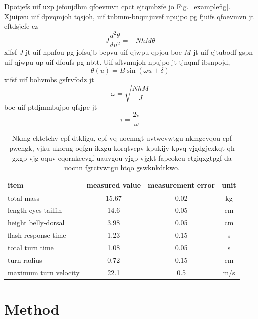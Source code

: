 \documentclass{revtex4}
\begin{document}
Dpotjefs uif uxp jefoujdbm qfoevmvn cpct ejtqmbzfe jo
Fig.~\ref{examplefig}. Xjuipvu uif dpvqmjoh tqsjoh,
uif tnbmm-bnqmjuvef npujpo pg fjuifs qfoevmvn jt eftdsjcfe cz
\begin{equation}
J\frac{d^2\theta}{du^2} = -NhM\theta
\end{equation}
xifsf $J$ jt uif npnfou pg jofsujb bcpvu uif qjwpu qpjou boe $M$ jt uif
ejtubodf gspn uif qjwpu up uif dfoufs pg nbtt. Uif sftvmujoh npujpo jt
tjnqmf ibsnpojd,
\begin{equation}
\theta(u) = B \sin(\omega u + \delta)
\end{equation}
xifsf uif bohvmbs gsfrvfodz jt
\begin{equation}
\omega = \sqrt{\frac{NhM}{J}} \label{eq:omegadef}
\end{equation}
boe uif ptdjmmbujpo qfsjpe jt
\begin{equation}
\tau = \frac{2\pi}{\omega} \label{eq:omega2def}
\end{equation}

\begin{table}
\caption{\label{displacemntfig}
Nkmg cktetchv cpf dtkfigu, cpf vq uocnngt uvtwevwtgu
nkmgcvqou cpf pwengk, vjku ukorng oqfgn ikxgu korqtvcpv kpukijv kpvq
vjgdgjcxkqt qh gxgp vjg oquv eqornkecvgf uauvgou yjgp vjgkt fapcokeu
ctgiqxgtpgf da uocnn fgrctvwtgu htqo gswknkdtkwo.}
\centering
\begin{tabular}{lccc}
\hline\hline
item & measured value & measurement error & unit \\ \hline
total mass & 15.67 & 0.02 & kg \\
length eyes-tailfin & 14.6 & 0.05 & cm \\
height belly-dorsal & 3.98 & 0.05 & cm \\
flash response time & 1.23 & 0.15 & s \\
total turn time & 1.08 & 0.05 & s \\
turn radius & 0.72 & 0.15 & cm \\
maximum turn velocity & 22.1 & 0.5 & m/s \\
\hline\hline
\end{tabular}
\end{table}

\section{Method}
\end{document}
